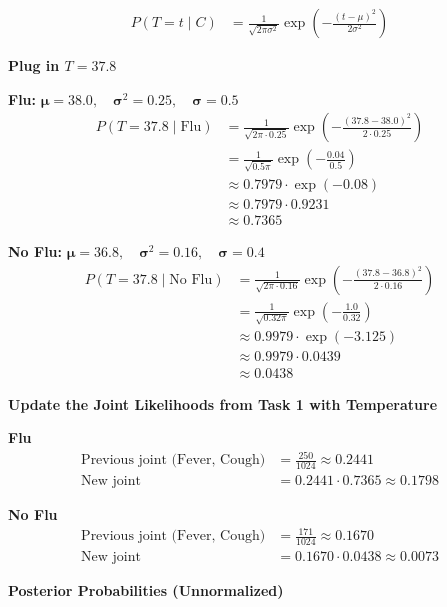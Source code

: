 \documentclass[a4paper,12pt]{article}
\begin{document}
\begin{align*}
P(T = t \mid C) &= \frac{1}{\sqrt{2\pi\sigma^2}} \exp\left( -\frac{(t - \mu)^2}{2\sigma^2} \right)
\end{align*}

\textbf{Plug in $T = 37.8$}

\vspace{1cm}

\textbf{Flu: } $\bm{\mu} = 38.0, \quad \bm{\sigma}^2 = 0.25, \quad \bm{\sigma} = 0.5$
\begin{align*}
P(T = 37.8 \mid \text{Flu}) &= \frac{1}{\sqrt{2\pi \cdot 0.25}} \exp\left( -\frac{(37.8 - 38.0)^2}{2 \cdot 0.25} \right) \\
&= \frac{1}{\sqrt{0.5\pi}} \exp\left( -\frac{0.04}{0.5} \right) \\
&\approx 0.7979 \cdot \exp(-0.08) \\
&\approx 0.7979 \cdot 0.9231 \\
&\approx 0.7365
\end{align*}

\textbf{No Flu: } $\bm{\mu} = 36.8, \quad \bm{\sigma}^2 = 0.16, \quad \bm{\sigma} = 0.4$
\begin{align*}
P(T = 37.8 \mid \text{No Flu}) &= \frac{1}{\sqrt{2\pi \cdot 0.16}} \exp\left( -\frac{(37.8 - 36.8)^2}{2 \cdot 0.16} \right) \\
&= \frac{1}{\sqrt{0.32\pi}} \exp\left( -\frac{1.0}{0.32} \right) \\
&\approx 0.9979 \cdot \exp(-3.125) \\
&\approx 0.9979 \cdot 0.0439 \\
&\approx 0.0438
\end{align*}

\newpage

\textbf{Update the Joint Likelihoods from Task 1 with Temperature}

\textbf{Flu}
\begin{align*}
\text{Previous joint (Fever, Cough)} &= \frac{250}{1024} \approx 0.2441 \\
\text{New joint} &= 0.2441 \cdot 0.7365 \approx 0.1798
\end{align*}

\textbf{No Flu}
\begin{align*}
\text{Previous joint (Fever, Cough)} &= \frac{171}{1024} \approx 0.1670 \\
\text{New joint} &= 0.1670 \cdot 0.0438 \approx 0.0073
\end{align*}

\textbf{Posterior Probabilities (Unnormalized)}
\end{document}
